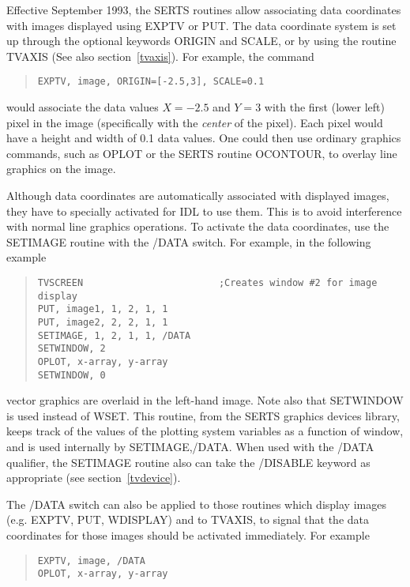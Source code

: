 Effective September 1993, the SERTS routines allow associating data coordinates
with images displayed using EXPTV or PUT.  The data coordinate system is set up
through the optional keywords ORIGIN and SCALE, or by using the routine TVAXIS
(See also section~\ref{tvaxis}).  For example, the command
\begin{quote}
\begin{verbatim}
EXPTV, image, ORIGIN=[-2.5,3], SCALE=0.1
\end{verbatim}
\end{quote}
would associate the data values \mbox{$X = -2.5$} and \mbox{$Y = 3$} with the
first (lower left) pixel in the image (specifically with the {\em center} of
the pixel).  Each pixel would have a height and width of 0.1 data values.  One
could then use ordinary graphics commands, such as OPLOT or the SERTS routine
OCONTOUR, to overlay line graphics on the image.

Although data coordinates are automatically associated with displayed images,
they have to specially activated for IDL to use them.  This is to avoid
interference with normal line graphics operations.  To activate the data
coordinates, use the SETIMAGE routine with the /DATA switch.  For example, in
the following example
\begin{quote}
\begin{verbatim}
TVSCREEN                        ;Creates window #2 for image display
PUT, image1, 1, 2, 1, 1
PUT, image2, 2, 2, 1, 1
SETIMAGE, 1, 2, 1, 1, /DATA
SETWINDOW, 2
OPLOT, x-array, y-array
SETWINDOW, 0
\end{verbatim}
\end{quote}
vector graphics are overlaid in the left-hand image.  Note also that SETWINDOW
is used instead of WSET.  This routine, from the SERTS graphics devices
library, keeps track of the values of the plotting system variables as a
function of window, and is used internally by SETIMAGE,/DATA.  When used with
the /DATA qualifier, the SETIMAGE routine also can take the /DISABLE keyword as
appropriate (see section~\ref{tvdevice}).

The /DATA switch can also be applied to those routines which display images
(e.g. EXPTV, PUT, WDISPLAY) and to TVAXIS, to signal that the data coordinates
for those images should be activated immediately.  For example
\begin{quote}
\begin{verbatim}
EXPTV, image, /DATA
OPLOT, x-array, y-array
\end{verbatim}
\end{quote}

